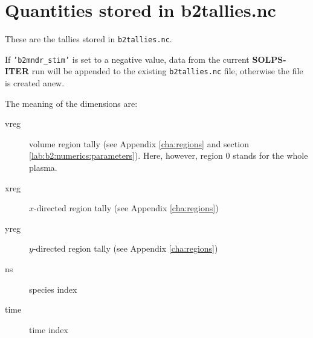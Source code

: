 \documentclass[a4paper,10pt]{report}
\newcommand\SOLPSITER{{\bf SOLPS-ITER} }
\begin{document}
\clearpage

\chapter{Quantities stored in b2tallies.nc}
\label{cha:b2tallies}

These are the tallies stored in {\tt b2tallies.nc}.

If {\tt 'b2mndr\_stim'} is set to a negative value, data from the current \SOLPSITER run will be appended to the existing {\tt b2tallies.nc} file, otherwise the file is created anew.

The meaning of the dimensions are:
\begin{description}
\item[vreg] volume region tally (see Appendix \ref{cha:regions} and section \ref{lab:b2:numerics:parameters}). Here, however, region 0 stands for the whole plasma.
\item[xreg] $x$-directed region tally (see Appendix \ref{cha:regions})
\item[yreg] $y$-directed region tally (see Appendix \ref{cha:regions})
\item[ns] species index
\item[time] time index
\end{description}
\end{document}
